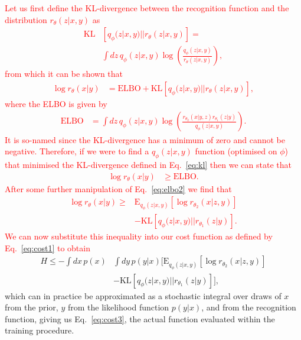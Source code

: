 \documentclass[%
showpacs,
nofootinbib,
 amsmath,amssymb,
 aps,
 twocolumn,
 prl,
 reprint,
floatfix,
]{revtex4-1}
\newcommand{\new}[1]{\textcolor{red}{#1}}
\begin{document}
%
%
\new{Let us first define the \ac{KL}-divergence between the recognition function and
the distribution $r_{\theta}(z|x,y)$ as 
%
\begin{align}\label{eq:kl}
\text{KL}&\left[q_{\phi}(z|x,y)||r_{\theta}(z|x,y)\right] = \\
&\int dz\,q_{\phi}(z|x,y)
\log\left(\frac{q_{\phi}(z|x,y)}{r_{\theta}(z|x,y)}\right),\nonumber
\end{align}
%   
from which it can be shown that
%
\begin{align}\label{eq:elbo1}
\log r_{\theta}(x|y) &= \text{ELBO} + \text{KL}\left[q_{\phi}(z|x,y)||r_{\theta}(z|x,y)\right],
\end{align}
%
where the \ac{ELBO} is given by
%
\begin{align}\label{eq:elbo2}
\text{ELBO} &= \int dz\,
q_{\phi}(z|x,y)\log\left(\frac{r_{\theta_{2}}(x|y,z)r_{\theta_{1}}(z|y)}{q_{\phi}(z|x,y)}\right).
\end{align}
%
It is so-named since the \ac{KL}-divergence has a minimum of zero and cannot
be negative. Therefore, if we were to find a $q_{\phi}(z|x,y)$ function (optimised on
$\phi$) that minimised the \ac{KL}-divergence defined in Eq.~\ref{eq:kl} then we can state that
%
\begin{align}
\log r_{\theta}(x|y) &\geq \text{ELBO}.
\end{align}
%
After some further manipulation of Eq.~\ref{eq:elbo2} we find that
%
\begin{align}\label{eq:logr}
\log r_{\theta}(x|y) \geq  &\text{E}_{q_{\phi}(z|x,y)}\left[\log
r_{\theta_{2}}(x|z,y)\right] \nonumber\\
&-\text{KL}\left[q_{\phi}(z|x,y)||r_{\theta_{1}}(z|y)\right].
\end{align}
%
We can now substitute this inequality into our cost function as defined by
Eq.~\ref{eq:cost1} to obtain}
%
\begin{align}\label{eq:cost2}
H \leq  -\int dx\, p(x)&\int dy \,p(y|x)
\Big[\text{E}_{q_{\phi}(z|x,y)}\left[\log r_{\theta_{2}}(x|z,y)\right]
\nonumber\\
&-\text{KL}\left[q_{\phi}(z|x,y)||r_{\theta_{1}}(z|y)\right]\Big],  
\end{align}
%
which can in practice be approximated as a stochastic integral over draws of
$x$ from the prior, $y$ from the likelihood function $p(y|x)$, and from the
recognition function, giving us Eq.~\ref{eq:cost3}, the actual function
evaluated within the training procedure.
\end{document}
